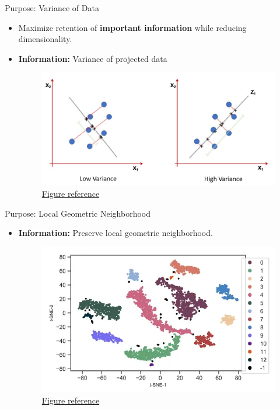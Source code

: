 \documentclass[serif, aspectratio=169]{beamer}
\begin{document}
\begin{frame}{Purpose: Variance of Data}
    \begin{itemize}
        \item Maximize retention of  \textbf{important information} while reducing dimensionality.
        \item \textbf{Information:} Variance of projected data
        \begin{figure}[htpb]
                \begin{center}
                    \includegraphics[keepaspectratio, scale=0.5]{pic/dim_red_var.JPG}
                    \caption{\href{https://bookdown.org/tpinto_home/Unsupervised-learning/principal-components-analysis.html}{Figure reference}}
                \end{center}
        \end{figure}
    \end{itemize}

\end{frame}

\begin{frame}{Purpose: Local Geometric Neighborhood}
    \begin{itemize}
        \item \textbf{Information:} Preserve local geometric neighborhood.
        \begin{figure}[htpb]
                \begin{center}
                    \includegraphics[keepaspectratio, scale=0.5]{pic/local_relation.PNG}
                  \caption{\href{https://www.reneshbedre.com/blog/tsne.html}{Figure reference}}
                \end{center}
        \end{figure}
    \end{itemize}
\end{frame}
\end{document}
